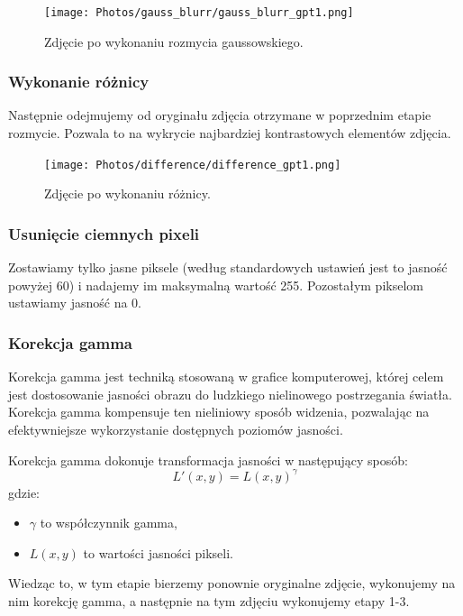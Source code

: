 \documentclass[]{mwart}
\begin{document}
\begin{figure}[H]
    \centering
    \texttt{[image: Photos/gauss\_blurr/gauss\_blurr\_gpt1.png]}
    \caption{Zdjęcie po wykonaniu rozmycia gaussowskiego.}
\end{figure}

\subsubsection{Wykonanie różnicy}
Następnie odejmujemy od oryginału zdjęcia otrzymane w poprzednim etapie rozmycie.
Pozwala to na wykrycie najbardziej kontrastowych elementów zdjęcia.

\begin{figure}[H]
    \centering
    \texttt{[image: Photos/difference/difference\_gpt1.png]}
    \caption{Zdjęcie po wykonaniu różnicy.}
\end{figure}

\subsubsection{Usunięcie ciemnych pixeli}
Zostawiamy tylko jasne piksele (według standardowych ustawień jest
to jasność powyżej 60) i nadajemy im maksymalną wartość 255.
Pozostałym pikselom ustawiamy jasność na 0.

\newpage
\subsubsection{Korekcja gamma}

Korekcja gamma jest techniką stosowaną w grafice komputerowej, której celem jest dostosowanie
jasności obrazu do ludzkiego nielinowego postrzegania światła. Korekcja gamma kompensuje ten
nieliniowy sposób widzenia, pozwalając na efektywniejsze wykorzystanie dostępnych poziomów jasności.

Korekcja gamma dokonuje transformacja jasności w następujący sposób:
\begin{equation}
    L'(x,y) = L(x,y)^{\gamma}
\end{equation}
gdzie:
\begin{itemize}
    \item $\gamma$ to współczynnik gamma,
    \item $L(x,y)$ to wartości jasności pikseli.
\end{itemize}

Wiedząc to, w tym etapie bierzemy ponownie oryginalne zdjęcie, wykonujemy
na nim korekcję gamma, a następnie na tym zdjęciu wykonujemy etapy 1-3.
\end{document}
